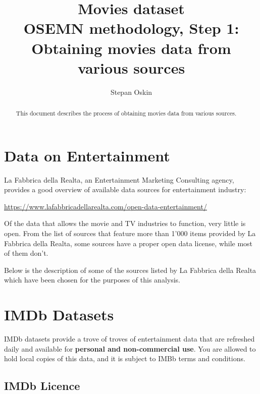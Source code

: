 \documentclass[11pt]{article}
\begin{document}
    \title{Movies dataset \\
    OSEMN methodology, Step 1: \\
    Obtaining movies data from various sources}

    \author{Stepan Oskin}

    \maketitle

    \begin{abstract}
        This document describes the process of obtaining movies data from various sources.
    \end{abstract}

    \section{Data on Entertainment} \label{sec:ent_data}

    La Fabbrica della Realta, an Entertainment Marketing Consulting agency, provides a good overview of available data sources for entertainment industry:

    \url{https://www.lafabbricadellarealta.com/open-data-entertainment/}

    \vspace{5mm}

    Of the data that allows the movie and TV industries to function, very little is open.
    From the list of sources that feature more than 1'000 items provided by La Fabbrica della Realta, some sources have a proper open data license, while most of them don't.

    Below is the description of some of the sources listed by La Fabbrica della Realta which have been chosen for the purposes of this analysis.

    \section{IMDb Datasets} \label{sec:imdb}

    IMDb datasets provide a trove of troves of entertainment data that are refreshed daily and available for \textbf{personal and non-commercial use}.
    You are allowed to hold local copies of this data, and it is subject to IMBb terms and conditions.

    \newpage

    \subsection{IMDb Licence} \label{subsec:imbd_licence}
\end{document}
